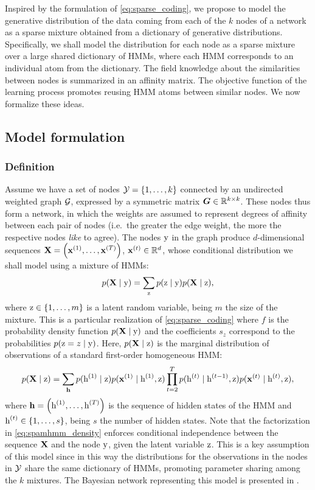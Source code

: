 Inspired by the formulation of \eqref{eq:sparse_coding}, we propose to model the generative distribution of the data coming from each of the $k$ nodes of a network as a sparse mixture obtained from a dictionary of generative distributions. Specifically, we shall model the distribution for each node as a sparse mixture over a large shared dictionary of HMMs, where each HMM corresponds to an individual atom from the dictionary.
The field knowledge about the similarities between nodes is summarized in an affinity matrix. The objective function of the learning process promotes reusing HMM atoms between similar nodes.
We now formalize these ideas.

\subsection{Model formulation}
\subsubsection{Definition}
\label{sec:spamhmm_definition}
Assume we have a set of nodes ${\mathcal{Y}}=\{1, \dots, k\}$ connected by an undirected weighted graph ${\mathcal{G}}$, expressed by a symmetric matrix ${\bm{G}} \in \mathbb{R}^{k \times k}$. These nodes thus form a network, in which the weights are assumed to represent degrees of affinity between each pair of nodes (i.e.\ the greater the edge weight, the more the respective nodes \textit{like} to agree). The nodes ${\textnormal{y}}$ in the graph produce $d$-dimensional sequences ${\mathbf{X}} = \left({\mathbf{x}}^{(1)}, \dots,{\mathbf{x}}^{(T)} \right)$, ${\mathbf{x}}^{(t)} \in \mathbb{R}^d$, whose conditional distribution we shall model using a mixture of HMMs:
\begin{equation}
    \label{eq:spamhmm_density}
    p({\mathbf{X}} \mid {\textnormal{y}}) = \sum_{{\textnormal{z}}} p({\textnormal{z}}\mid{\textnormal{y}}) p({\mathbf{X}} \mid {\textnormal{z}}),
\end{equation}
where ${\textnormal{z}} \in \{1, \dots, m\}$ is a latent random variable, being $m$ the size of the mixture. This is a particular realization of \eqref{eq:sparse_coding} where $f$ is the probability density function $p({\mathbf{X}} \mid {\textnormal{y}})$ and the coefficients $s_z$ correspond to the probabilities $p({\textnormal{z}} = z \mid {\textnormal{y}})$. Here, $p({\mathbf{X}} \mid {\textnormal{z}})$ is the marginal distribution of observations of a standard first-order homogeneous HMM:
\begin{equation}
    \label{eq:spamhmm_hmm}
    p({\mathbf{X}} \mid {\textnormal{z}}) = \sum_{{\mathbf{h}}} p({\textnormal{h}}^{(1)} \mid {\textnormal{z}}) p({\mathbf{x}}^{(1)} \mid {\textnormal{h}}^{(1)},{\textnormal{z}}) \prod_{t=2}^T p({\textnormal{h}}^{(t)}\mid{\textnormal{h}}^{(t-1)},{\textnormal{z}}) p({\mathbf{x}}^{(t)} \mid {\textnormal{h}}^{(t)},{\textnormal{z}}),
\end{equation}
where ${\mathbf{h}} = \left({\textnormal{h}}^{(1)}, \dots,{\textnormal{h}}^{(T)} \right)$ is the sequence of hidden states of the HMM and ${\textnormal{h}}^{(t)} \in \{1, \dots, s\}$, being $s$ the number of hidden states. Note that the factorization in \eqref{eq:spamhmm_density} enforces conditional independence between the sequence ${\mathbf{X}}$ and the node ${\textnormal{y}}$, given the latent variable ${\textnormal{z}}$. This is a key assumption of this model since in this way the distributions for the observations in the nodes in ${\mathcal{Y}}$ share the same dictionary of HMMs, promoting parameter sharing among the $k$ mixtures. The Bayesian network representing this model is presented in .

